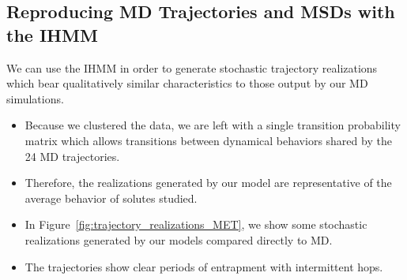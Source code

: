 \documentclass{article}
\begin{document}
  \subsection{Reproducing MD Trajectories and MSDs with the IHMM}
  
  We can use the IHMM in order to generate stochastic trajectory realizations
  which bear qualitatively similar characteristics to those output
  by our MD simulations.
  \begin{itemize}
    \item Because we clustered the data, we are left with a single transition
    probability matrix which allows transitions between dynamical behaviors
    shared by the 24 MD trajectories.
    \item Therefore, the realizations generated by our model are representative
    of the average behavior of solutes studied.
    \item In Figure~\ref{fig:trajectory_realizations_MET}, we show some stochastic
    realizations generated by our models compared directly to MD.
    \item The trajectories show clear periods of entrapment with intermittent hops.
  \end{itemize}
  
\end{document}
